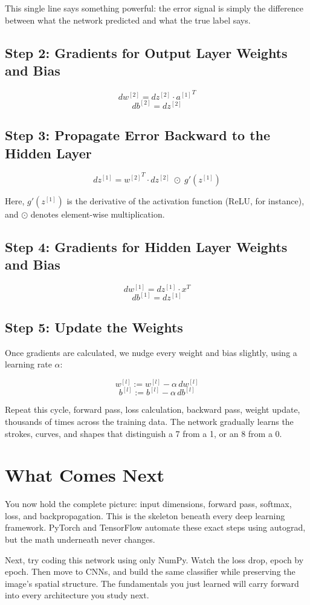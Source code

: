 \documentclass[11pt]{article}
\begin{document}
This single line says something powerful: the error signal is simply the difference between what the network predicted and what the true label says.

\subsection*{Step 2: Gradients for Output Layer Weights and Bias}

\[
dw^{[2]} = dz^{[2]} \cdot {a^{[1]}}^T
\]
\[
db^{[2]} = dz^{[2]}
\]

\subsection*{Step 3: Propagate Error Backward to the Hidden Layer}

\[
dz^{[1]} = {w^{[2]}}^T \cdot dz^{[2]} \;\odot\; g'(z^{[1]})
\]

Here, $g'(z^{[1]})$ is the derivative of the activation function (ReLU, for instance), and $\odot$ denotes element-wise multiplication.

\subsection*{Step 4: Gradients for Hidden Layer Weights and Bias}

\[
dw^{[1]} = dz^{[1]} \cdot x^T
\]
\[
db^{[1]} = dz^{[1]}
\]

\subsection*{Step 5: Update the Weights}

Once gradients are calculated, we nudge every weight and bias slightly, using a learning rate $\alpha$:

\[
w^{[l]} := w^{[l]} - \alpha \, dw^{[l]}
\]
\[
b^{[l]} := b^{[l]} - \alpha \, db^{[l]}
\]

Repeat this cycle, forward pass, loss calculation, backward pass, weight update, thousands of times across the training data. The network gradually learns the strokes, curves, and shapes that distinguish a 7 from a 1, or an 8 from a 0.

\section*{What Comes Next}

You now hold the complete picture: input dimensions, forward pass, softmax, loss, and backpropagation. This is the skeleton beneath every deep learning framework. PyTorch and TensorFlow automate these exact steps using autograd, but the math underneath never changes.

Next, try coding this network using only NumPy. Watch the loss drop, epoch by epoch. Then move to CNNs, and build the same classifier while preserving the image's spatial structure. The fundamentals you just learned will carry forward into every architecture you study next.
\end{document}
